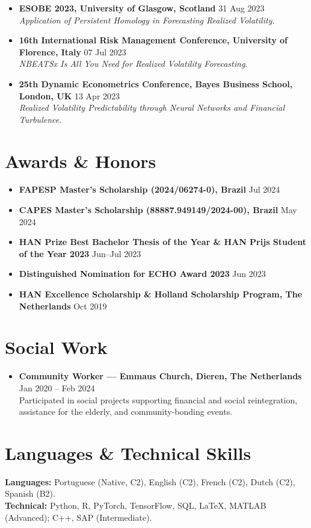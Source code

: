 \documentclass[10pt,a4paper]{article}
\newcommand{\cvitem}[2]{\textbf{#1} \hfill {\small\color{muted}#2}\\}
\begin{document}
\begin{itemize}
    \textit{To What Extent Does ESG Impact Profitability Within the Airline Industry}.
    \item \cvitem{ESOBE 2023, University of Glasgow, Scotland}{31 Aug 2023}
    \textit{Application of Persistent Homology in Forecasting Realized Volatility}.
    \item \cvitem{16th International Risk Management Conference, University of Florence, Italy}{07 Jul 2023}
    \textit{NBEATSx Is All You Need for Realized Volatility Forecasting}.
    \item \cvitem{25th Dynamic Econometrics Conference, Bayes Business School, London, UK}{13 Apr 2023}
    \textit{Realized Volatility Predictability through Neural Networks and Financial Turbulence}.
    \fi
\end{itemize}

\section{Awards \& Honors}
\begin{itemize}
    \item \cvitem{FAPESP Master's Scholarship (2024/06274-0), Brazil}{Jul 2024}
    \item \cvitem{CAPES Master's Scholarship (88887.949149/2024-00), Brazil}{May 2024}
    \item \cvitem{HAN Prize Best Bachelor Thesis of the Year \& HAN Prijs Student of the Year 2023}{Jun--Jul 2023}
    \ifshortcv\else
    \item \cvitem{Distinguished Nomination for ECHO Award 2023}{Jun 2023}
    \item \cvitem{HAN Excellence Scholarship \& Holland Scholarship Program, The Netherlands}{Oct 2019}
    \fi
\end{itemize}

\ifshortcv\else
\section{Social Work}
\begin{itemize}
    \item \cvitem{Community Worker --- Emmaus Church, Dieren, The Netherlands}{Jan 2020 -- Feb 2024}
    Participated in social projects supporting financial and social reintegration, assistance for the elderly, and community-bonding events.
\end{itemize}
\fi

\section{Languages \& Technical Skills}
\textbf{Languages:} Portuguese (Native, C2), English (C2), French (C2), Dutch (C2), Spanish (B2).\\
\textbf{Technical:} Python, R, PyTorch, TensorFlow, SQL, \LaTeX, MATLAB (Advanced); C++, SAP (Intermediate).
\end{document}
